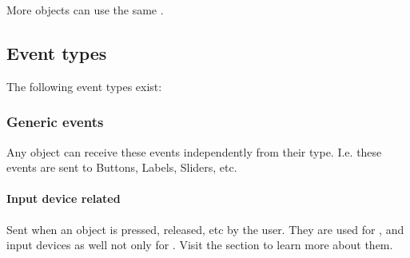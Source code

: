 \documentclass[letterpaper,10pt,english]{sphinxmanual}
\begin{document}
More objects can use the same .


\subsection{Event types}
\label{\detokenize{overview/events:event-types}}
The following event types exist:


\subsubsection{Generic events}
\label{\detokenize{overview/events:generic-events}}
Any object can receive these events independently from their type. I.e. these events are sent to Buttons, Labels, Sliders, etc.


\paragraph{Input device related}
\label{\detokenize{overview/events:input-device-related}}
Sent when an object is pressed, released, etc by the user. They are used for ,  and  input devices as well not only for . Visit the {\hyperref[\detokenize{overview/indev::doc}]{}} section to learn more about them.
\end{document}
